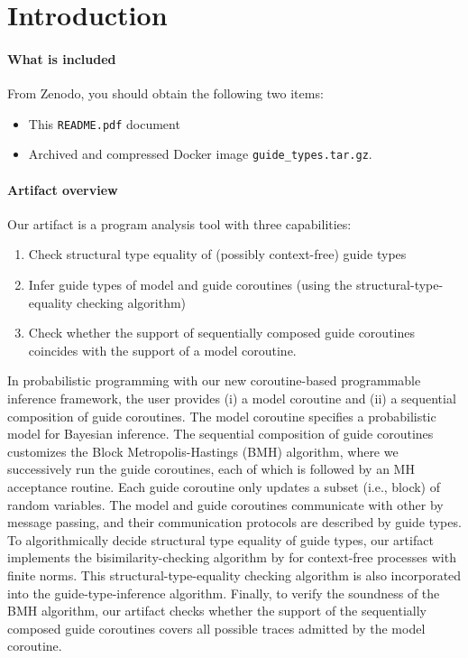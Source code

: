 
\section{Introduction}

\paragraph{What is included}

From Zenodo, you should obtain the following two items:
\begin{itemize}
  \item This \texttt{README.pdf} document
  \item Archived and compressed Docker image \texttt{guide\_types.tar.gz}.
\end{itemize}

\paragraph{Artifact overview}

Our artifact is a program analysis tool with three capabilities:
\begin{enumerate}
  \item Check structural type equality of (possibly context-free) guide types
  \item Infer guide types of model and guide coroutines (using the
        structural-type-equality checking algorithm)
  \item Check whether the support of sequentially composed guide coroutines
        coincides with the support of a model coroutine.
\end{enumerate}

In probabilistic programming with our new coroutine-based programmable inference
framework, the user provides (i) a model coroutine and (ii) a sequential
composition of guide coroutines.
%
The model coroutine specifies a probabilistic model for Bayesian inference.
%
The sequential composition of guide coroutines customizes the Block
Metropolis-Hastings (BMH) algorithm, where we successively run the guide
coroutines, each of which is followed by an MH acceptance routine.
%
Each guide coroutine only updates a subset (i.e., block) of random variables.
%
The model and guide coroutines communicate with other by message passing, and
their communication protocols are described by guide types.
%
To algorithmically decide structural type equality of guide types, our artifact
implements the bisimilarity-checking algorithm by \citeauthor{Hirshfeld1994} for
context-free processes with finite norms.
%
This structural-type-equality checking algorithm is also incorporated into the
guide-type-inference algorithm.
%
Finally, to verify the soundness of the BMH algorithm, our artifact checks
whether the support of the sequentially composed guide coroutines covers all
possible traces admitted by the model coroutine.

